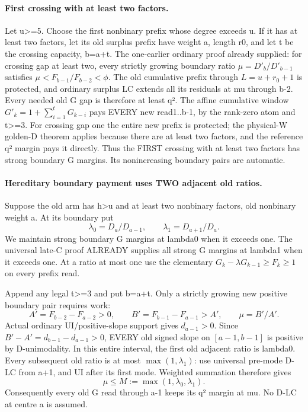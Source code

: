 \paragraph{First crossing with at least two factors.}
Let u>=5. Choose the first nonbinary prefix whose degree exceeds u.
If it has at least two factors, let its old surplus prefix have weight
a, length r0, and let t be the crossing capacity, b=a+t.
The one-earlier ordinary proof already supplied:
for crossing gap at least two, every strictly growing boundary ratio
$\mu=D'_b/D'_{b-1}$ satisfies
$\mu<F_{b-1}/F_{b-2}<\phi$.
The old cumulative prefix through $L=u+r_0+1$ is protected,
and ordinary surplus LC extends all its residuals at mu through b-2.
Every needed old G gap is therefore at least q².
The affine cumulative window $G'_k=1+\sum_{i=1}^tG_{k-i}$
pays EVERY new read1..b-1, by the rank-zero atom and t>=3.
For crossing gap one the entire new prefix is protected;
the physical-W golden-D theorem applies because there are at least
two factors, and the reference q² margin pays it directly.
Thus the FIRST crossing with at least two factors has strong boundary
G margins. Its nonincreasing boundary pairs are automatic.

\paragraph{Hereditary boundary payment uses TWO adjacent old ratios.}
Suppose the old arm has h>u and at least two nonbinary factors,
old nonbinary weight a. At its boundary put
\[
 \lambda_0=D_a/D_{a-1},\qquad\lambda_1=D_{a+1}/D_a.
\]
We maintain strong boundary G margins at lambda0 when it exceeds one.
The universal late-C proof ALREADY supplies all strong G margins at
lambda1 when it exceeds one. At a ratio at most one use the elementary
$G_k-\lambda G_{k-1}\ge F_k\ge1$ on every prefix read.

Append any legal t>=3 and put b=a+t. Only a strictly growing new
positive boundary pair requires work:
\[
 A'=F_{b-2}-F_{a-2}>0,\qquad B'=F_{b-1}-F_{a-1}>A',\qquad
 \mu=B'/A'.
\]
Actual ordinary UI/positive-slope support gives $d_{a-1}>0$.
Since $B'-A'=d_{b-1}-d_{a-1}>0$, EVERY old signed slope on
$[a-1,b-1]$ is positive by D-unimodality.
In this entire interval, the first old adjacent ratio is lambda0.
Every subsequent old ratio is at most $\max(1,\lambda_1)$:
use universal pre-mode D-LC from a+1, and UI after its first mode.
Weighted summation therefore gives
\[
                    \mu\le M:=\max(1,\lambda_0,\lambda_1).          \tag{3}
\]
Consequently every old G read through a-1 keeps its q² margin at mu.
No D-LC at centre a is assumed.


